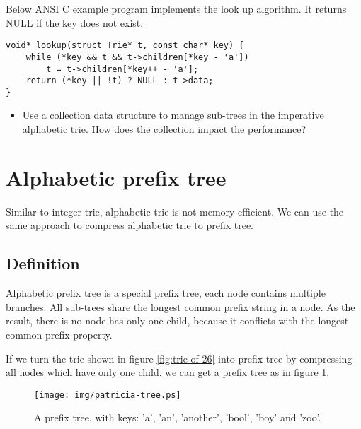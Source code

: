 \documentclass[b5paper]{article}
\begin{document}
Below ANSI C example program implements the look up algorithm.
It returns NULL if the key does not exist.

\lstset{language=C}
\begin{lstlisting}
void* lookup(struct Trie* t, const char* key) {
    while (*key && t && t->children[*key - 'a'])
        t = t->children[*key++ - 'a'];
    return (*key || !t) ? NULL : t->data;
}
\end{lstlisting}

\begin{Exercise}
\begin{itemize}
\item Use a collection data structure to manage sub-trees in the imperative
alphabetic trie. How does the collection impact the performance?
\end{itemize}
\end{Exercise}

\section{Alphabetic prefix tree}

Similar to integer trie, alphabetic trie is not memory
efficient. We can use the same approach to compress alphabetic trie to
prefix tree.

\subsection{Definition}

Alphabetic prefix tree is a special prefix tree, each node contains
multiple branches. All sub-trees share the longest common
prefix string in a node. As the result, there is no node has only one child,
because it conflicts with the longest common prefix property.

If we turn the trie shown in figure \ref{fig:trie-of-26} into prefix tree
by compressing all nodes which have only one child. we can get
a prefix tree as in figure \ref{fig:patricia-tree}.

\begin{figure}[htbp]
  \centering
  \texttt{[image: img/patricia-tree.ps]}
  \caption{A prefix tree, with keys: 'a', 'an', 'another', 'bool',
    'boy' and 'zoo'.}
  \label{fig:patricia-tree}
\end{figure}
\end{document}
